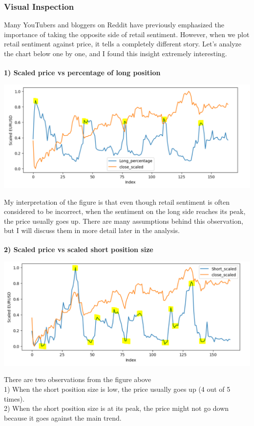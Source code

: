 \documentclass{article}
\begin{document}
\subsubsection{Visual Inspection}
Many YouTubers and bloggers on Reddit have previously emphasized the importance of taking the opposite side of retail sentiment. However, when we plot retail sentiment against price, it tells a completely different story. Let's analyze the chart below one by one, and I found this insight extremely interesting. \\ \\ 
\textbf{1) Scaled price vs percentage of long position}
\begin{center}
    \includegraphics[scale=0.7]{p2.png}    
\end{center}
My interpretation of the figure is that even though retail sentiment is often considered to be incorrect, when the sentiment on the long side reaches its peak, the price usually goes up. There are many assumptions behind this observation, but I will discuss them in more detail later in the analysis. \\ \\ 

\textbf{2) Scaled price vs scaled short position size}
\begin{center}
    \includegraphics[scale=0.7]{p3.png}    
\end{center}
There are two observations from the figure above \\
1) When the short position size is low, the price usually goes up (4 out of 5 times). \\
2) When the short position size is at its peak, the price might not go down because it goes against the main trend.  \\ \\
\end{document}
